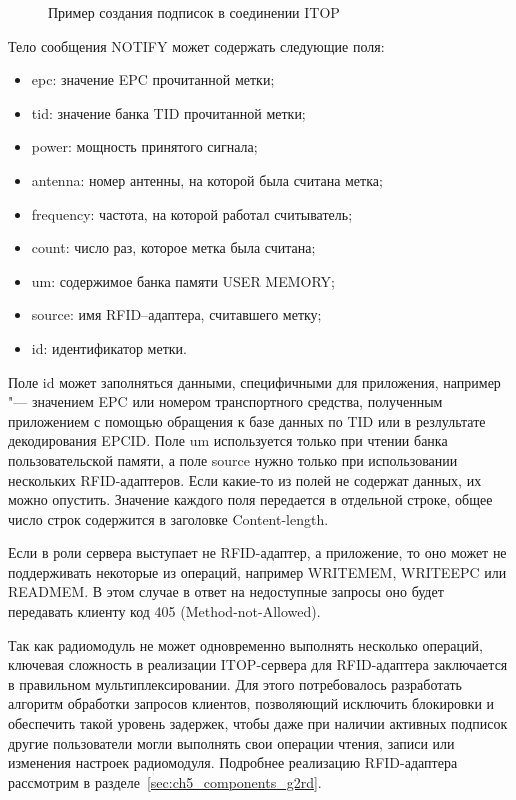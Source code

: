 \begin{figure}[ht]
  \caption{Пример создания подписок в соединении ITOP}
  \label{fig:ch5_itop_session_2}
\end{figure}

Тело сообщения NOTIFY может содержать следующие поля:

\begin{itemize}
	\item epc: значение EPC прочитанной метки;
	\item tid: значение банка TID прочитанной метки;
	\item power: мощность принятого сигнала;
	\item antenna: номер антенны, на которой была считана метка;
	\item frequency: частота, на которой работал считыватель;
	\item count: число раз, которое метка была считана;
	\item um: содержимое банка памяти USER MEMORY;
	\item source: имя RFID--адаптера, считавшего метку;
	\item id: идентификатор метки.
\end{itemize}

Поле id может заполняться данными, специфичными для приложения, например "--- значением EPC или номером транспортного средства, полученным приложением с помощью обращения к базе данных по TID или в резлультате декодирования EPCID. Поле um используется только при чтении банка пользовательской памяти, а поле source нужно только при использовании нескольких RFID-адаптеров. Если какие-то из полей не содержат данных, их можно опустить. Значение каждого поля передается в отдельной строке, общее число строк содержится в заголовке Content-length.

Если в роли сервера выступает не RFID-адаптер, а приложение, то оно может не поддерживать некоторые из операций, например WRITEMEM, WRITEEPC или READMEM. В этом случае в ответ на недоступные запросы оно будет передавать клиенту код 405 (Method-not-Allowed).

Так как радиомодуль не может одновременно выполнять несколько операций, ключевая сложность в реализации ITOP-сервера для RFID-адаптера заключается в правильном мультиплексировании. Для этого потребовалось разработать алгоритм обработки запросов клиентов, позволяющий исключить блокировки и обеспечить такой уровень задержек, чтобы даже при наличии активных подписок другие пользователи могли выполнять свои операции чтения, записи или изменения настроек радиомодуля. Подробнее реализацию RFID-адаптера рассмотрим в разделе~\ref{sec:ch5_components_g2rd}.


